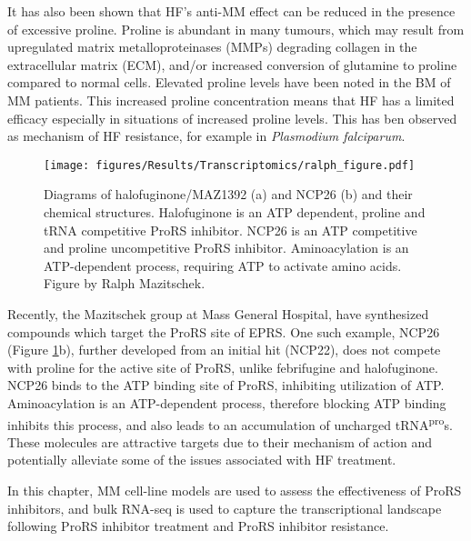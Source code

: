 It has also been shown that HF's anti-MM effect can be reduced in the presence of excessive proline\cite{leiba2012halofuginone}.
Proline is abundant in many tumours, which may result from upregulated matrix metalloproteinases (MMPs) degrading collagen in the extracellular matrix (ECM), and/or increased conversion of glutamine to proline compared to normal cells\cite{liu2013mirna}.
Elevated proline levels have been noted in the BM of MM patients\cite{fei2021metabolic}.
This increased proline concentration means that HF has a limited efficacy especially in situations of increased proline levels.
This has ben observed as mechanism of HF resistance, for example in \textit{Plasmodium falciparum}\cite{fagbami2019adaptive}.

\begin{figure}[ht]
    \centering
    \texttt{[image: figures/Results/Transcriptomics/ralph\_figure.pdf]}
    \caption[Halofuginone and NCP26 structures and domains]{Diagrams of halofuginone/MAZ1392 (a) and NCP26 (b) and their chemical structures.
    Halofuginone is an ATP dependent, proline and tRNA competitive ProRS inhibitor.
    NCP26 is an ATP competitive and proline uncompetitive ProRS inhibitor.
    Aminoacylation is an ATP-dependent process, requiring ATP to activate amino acids.
    Figure by Ralph Mazitschek.}
    \label{fig:ralph_diagrams}
\end{figure}

Recently, the Mazitschek group at Mass General Hospital, have synthesized compounds which target the ProRS site of EPRS.
One such example, NCP26 (Figure \ref{fig:ralph_diagrams}b), further developed from an initial hit (NCP22)\cite{adachi2017discovery}, does not compete with proline for the active site of ProRS, unlike febrifugine and halofuginone.
NCP26 binds to the ATP binding site of ProRS, inhibiting utilization of ATP\@.
Aminoacylation is an ATP-dependent process, therefore blocking ATP binding inhibits this process, and also leads to an accumulation of uncharged tRNA\textsuperscript{pro}s.
These molecules are attractive targets due to their mechanism of action and potentially alleviate some of the issues associated with HF treatment.


In this chapter, MM cell-line models are used to assess the effectiveness of ProRS inhibitors, and bulk RNA-seq is used to capture the transcriptional landscape following ProRS inhibitor treatment and ProRS inhibitor resistance.

\clearpage

